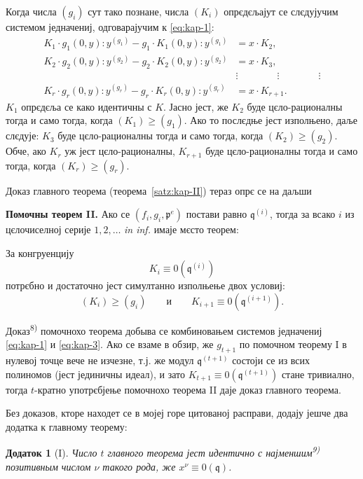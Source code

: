 \documentclass[11pt]{article}
\theoremstyle{plain}
\newtheorem{zusatz}{Додаток}
\begin{document}
Когда числа $(g_{i})$ сут тако познане, числа $(K_{i})$ опрєдєљајут
се слєдујучим системом једначениј, одговарајучим к \eqref{eq:kap-1}:
\begin{equation}\label{eq:kap-3}
\begin{aligned}
K_{1}\cdot g_{1}(0,y):y^{(g_{1})} - g_{1}\cdot K_{1}(0,y):y^{(g_{1})} &= x\cdot K_{2},\\
K_{2}\cdot g_{2}(0,y):y^{(g_{2})} - g_{2}\cdot K_{2}(0,y):y^{(g_{2})} &= x\cdot K_{3},\\
&\vdots \qquad\qquad\vdots\qquad\qquad\vdots\\
K_{r}\cdot g_{r}(0,y):y^{(g_{r})} - g_{r}\cdot K_{r}(0,y):y^{(g_{r})} &= x\cdot K_{r+1}.
\end{aligned}
\end{equation}
$K_{1}$ опрєдєља се како идентичны с $K$. Јасно јест, же $K_{2}$
буде цєло-рационалны тогда и само тогда, когда
$(K_{1}) \geq (g_{1})$. Ако то послєдње јест изполњено, даље
слєдује: $K_{3}$ буде цєло-рационалны тогда и само тогда, когда
$(K_{2}) \geq (g_{2})$. Обче, ако $K_{r}$ уж јест цєло-рационалны,
$K_{r+1}$ буде цєло-рационалны тогда и само тогда, когда
$(K_{r}) \geq (g_{r})$.

Доказ главного теорема (теорема~\ref{satz:kap-II}) тераз опрє се на
даљши

\smallskip
\textbf{Помочны теорем II.} Ако се
$(f_{i}, g_{i}, \mathfrak{p}^{e})$ постави равно
$\mathfrak{q}^{(i)}$, тогда за всако $i$ из цєлочиселној серије
$1, 2, \ldots$ \textit{in inf.} имаје мєсто теорем:

За конгруенцију
\[
K_{i} \equiv 0(\mathfrak{q}^{(i)})
\]
потрєбно и достаточно јест симултанно изполњење двох условиј:
\[
(K_{i}) \geq (g_{i}) \qquad \text{и} \qquad K_{i+1} \equiv 0(\mathfrak{q}^{(i+1)}).
\]

Доказ\textsuperscript{8)} помочнохо теорема добыва се комбиновањем
системов једначениј \eqref{eq:kap-1} и \eqref{eq:kap-3}. Ако се
взаме в обзир, же $g_{t+1}$ по помочном теорему I в нулевој точце вече не
изчезне, т.ј. же модул $\mathfrak{q}^{(t+1)}$ состоји се из всих
полиномов (јест јединичны идеал), и зато
$K_{t+1} \equiv 0(\mathfrak{q}^{(t+1)})$ стане тривиално, тогда
$t$-кратно употрєбјење помочнохо теорема II даје доказ главного
теорема.

\smallskip
Без доказов, кторе находет се в мојеј горе цитованој расправи,
додају јешче два додатка к главному теорему:

\begin{zusatz}[I]
Число $t$ главного теорема јест идентично с најменшим\textsuperscript{9)}
позитивным числом $\nu$ такого рода, же
$x^{\nu} \equiv 0(\mathfrak{q})$.
\end{zusatz}
\end{document}
